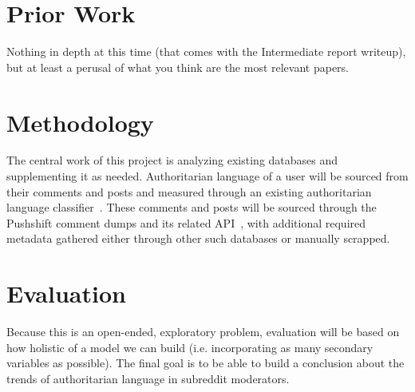 \documentclass[letterpaper,twocolumn,10pt]{article}
\begin{document}
\section{Prior Work}

Nothing in depth at this time (that comes with the Intermediate report writeup), but at least a perusal of what you think are the most relevant papers.

\section{Methodology}


The central work of this project is analyzing existing databases and supplementing it as needed. Authoritarian language of a user will be sourced from their comments and posts and measured through an existing authoritarian language classifier~\cite{classifier}. These comments and posts will be sourced through the Pushshift comment dumps and its related API~\cite{pushshift, dump}, with additional required metadata gathered either through other such databases or manually scrapped.

\section{Evaluation}

Because this is an open-ended, exploratory problem, evaluation will be based on how holistic of a model we can build (i.e. incorporating as many secondary variables as possible). The final goal is to be able to build a conclusion about the trends of authoritarian language in subreddit moderators.




\end{document}
